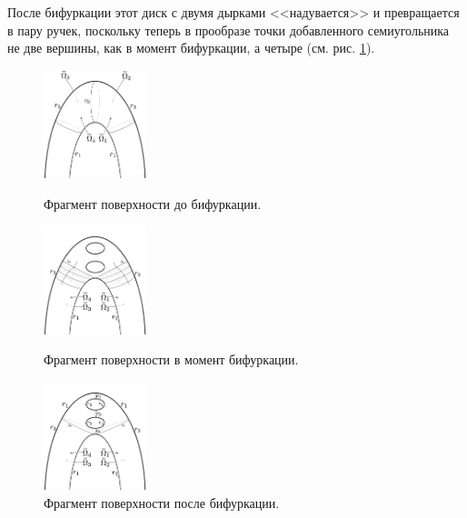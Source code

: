 После бифуркации этот диск с двумя дырками <<надувается>> и превращается в пару ручек, поскольку теперь в прообразе точки добавленного семиугольника не две вершины, как в момент бифуркации, а четыре (см. рис. \ref{fig:pt10:_II_after_surface_segment}).
\begin{figure}[!htb]
\centering
\includegraphics[width=3cm]{images/section3_circular/atoms/II/before/before_surface_segment.pdf}
    \caption{Фрагмент поверхности до бифуркации.}
        \label{fig:pt10:_II_before_surface}
\endminipage\hfill
{}
\centering
\includegraphics[width=3cm]{images/section3_circular/atoms/II/bifurcation/surface_segment.pdf}
    \caption{Фрагмент поверхности в момент бифуркации.}
        \label{fig:pt10:_II_surface_segment}
\endminipage\hfill
{}
\centering
\includegraphics[width=3cm]{images/section3_circular/atoms/II/after/surface_segment.pdf}
    \caption{Фрагмент поверхности после бифуркации.}
        \label{fig:pt10:_II_after_surface_segment}
\endminipage\hfill
\end{figure}

